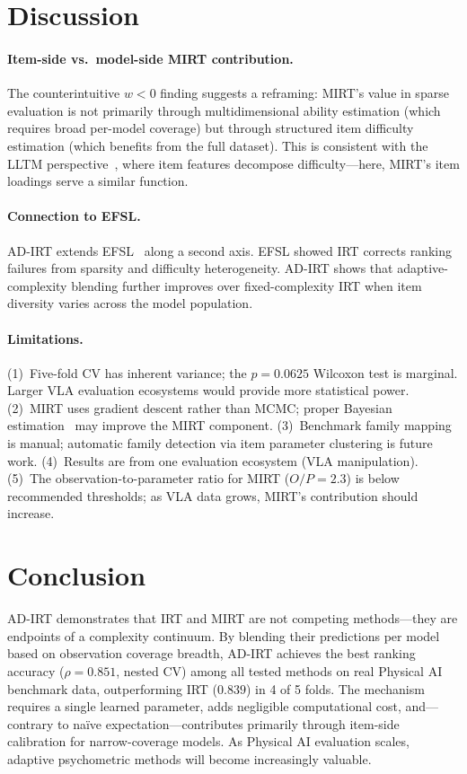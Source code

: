 \documentclass[11pt]{article}
\begin{document}
\FloatBarrier
\section{Discussion}

\paragraph{Item-side vs.\ model-side MIRT contribution.} The counterintuitive $w < 0$ finding suggests a reframing: MIRT's value in sparse evaluation is not primarily through multidimensional ability estimation (which requires broad per-model coverage) but through structured item difficulty estimation (which benefits from the full dataset). This is consistent with the LLTM perspective~\citep{fischer1973}, where item features decompose difficulty---here, MIRT's item loadings serve a similar function.

\paragraph{Connection to EFSL.} AD-IRT extends EFSL~\citep{kang2026efsl} along a second axis. EFSL showed IRT corrects ranking failures from sparsity and difficulty heterogeneity. AD-IRT shows that adaptive-complexity blending further improves over fixed-complexity IRT when item diversity varies across the model population.

\paragraph{Limitations.} (1)~Five-fold CV has inherent variance; the $p = 0.0625$ Wilcoxon test is marginal. Larger VLA evaluation ecosystems would provide more statistical power. (2)~MIRT uses gradient descent rather than MCMC; proper Bayesian estimation~\citep{reckase2009} may improve the MIRT component. (3)~Benchmark family mapping is manual; automatic family detection via item parameter clustering is future work. (4)~Results are from one evaluation ecosystem (VLA manipulation). (5)~The observation-to-parameter ratio for MIRT ($O/P = 2.3$) is below recommended thresholds; as VLA data grows, MIRT's contribution should increase.

\section{Conclusion}

AD-IRT demonstrates that IRT and MIRT are not competing methods---they are endpoints of a complexity continuum. By blending their predictions per model based on observation coverage breadth, AD-IRT achieves the best ranking accuracy ($\rho = 0.851$, nested CV) among all tested methods on real Physical AI benchmark data, outperforming IRT ($0.839$) in 4 of 5 folds. The mechanism requires a single learned parameter, adds negligible computational cost, and---contrary to na\"ive expectation---contributes primarily through item-side calibration for narrow-coverage models. As Physical AI evaluation scales, adaptive psychometric methods will become increasingly valuable.
\end{document}
